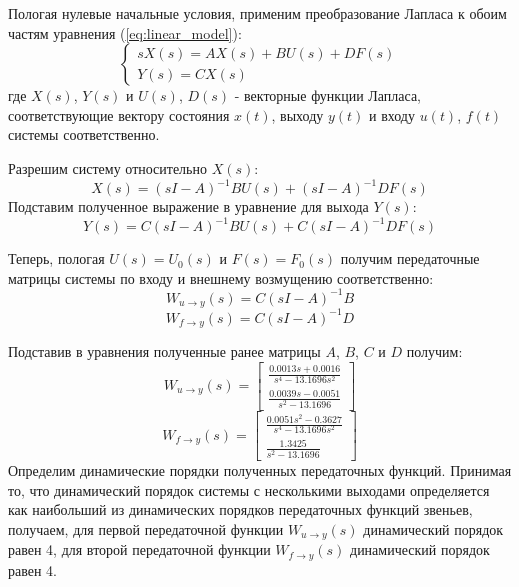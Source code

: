 Пологая нулевые начальные условия, применим преобразование Лапласа к обоим частям уравнения (\ref{eq:linear_model}): 
\begin{equation}
    \begin{cases}
        sX(s) = AX(s) + BU(s) + DF(s) \\ 
        Y(s) = CX(s)
    \end{cases}
\end{equation}
где $X(s)$, $Y(s)$ и $U(s)$, $D(s)$ - векторные функции Лапласа, соответствующие вектору состояния $x(t)$, выходу $y(t)$ и входу $u(t)$, $f(t)$ системы соответственно.

Разрешим систему относительно $X(s)$:
\begin{equation}
    X(s) = (sI - A)^{-1}BU(s) + (sI - A)^{-1}DF(s)
\end{equation}
Подставим полученное выражение в уравнение для выхода $Y(s)$:
\begin{equation}
    Y(s) = C(sI - A)^{-1}BU(s) + C(sI - A)^{-1}DF(s)
\end{equation}

Теперь, пологая $U(s) = U_0(s)$ и $F(s) = F_0(s)$ получим передаточные матрицы системы по входу и внешнему возмущению соответственно:
\begin{equation}
    W_{u\rightarrow y}(s) = C(sI - A)^{-1}B
\end{equation}
\begin{equation}
    W_{f\rightarrow y}(s) = C(sI - A)^{-1}D
\end{equation}

Подставив в уравнения полученные ранее матрицы $A$, $B$, $C$ и $D$ получим: 
\begin{equation}
    W_{u \rightarrow y}(s) = \begin{bmatrix}
    \frac{0.0013s + 0.0016}{s^4 - 13.1696s^2} \\ 
    \frac{0.0039s - 0.0051}{s^2 - 13.1696}
    \end{bmatrix}
\end{equation}
\begin{equation}
    W_{f \rightarrow y}(s) = \begin{bmatrix}
    \frac{0.0051s^2 - 0.3627}{s^4 - 13.1696s^2} \\ 
    \frac{1.3425}{s^2 - 13.1696}
    \end{bmatrix}
\end{equation}
Определим динамические порядки полученных передаточных функций. 
Принимая то, что динамический порядок системы с несколькими выходами определяется как 
наибольший из динамических порядков передаточных функций звеньев, получаем, 
для первой передаточной функции $W_{u \rightarrow y}(s)$ динамический порядок равен 4, 
для второй передаточной функции $W_{f \rightarrow y}(s)$ динамический порядок равен 4. 


